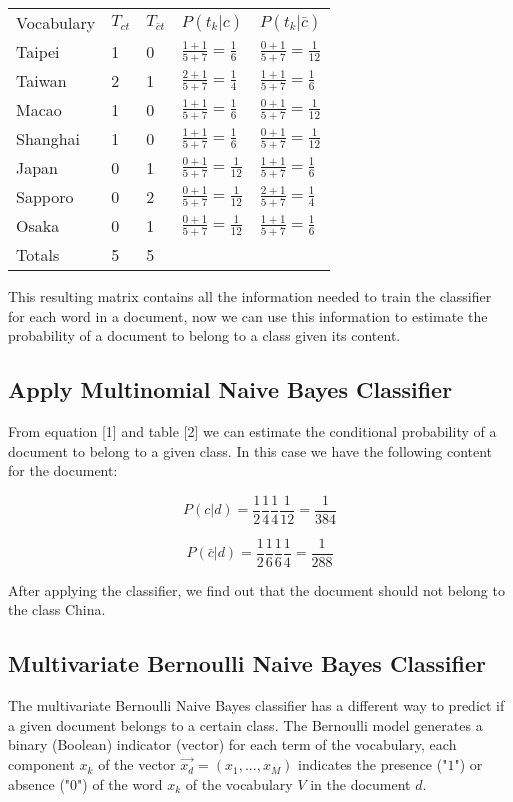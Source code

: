 \begin{table}[H]
\begin{tabular}{lllll}
Vocabulary & $T_{ct}$ &  $T_{\bar{c}t}$ & $P(t_k|c)$  & $P(t_k|\bar{c})$ \\
Taipei & 1 & 0 & $\frac{1+1}{5+7} = \frac{1}{6}$ & $\frac{0+1}{5+7} = \frac{1}{12}$ \\
Taiwan & 2 & 1 & $\frac{2+1}{5+7} = \frac{1}{4}$ & $\frac{1+1}{5+7} = \frac{1}{6}$ \\
Macao & 1 & 0 & $\frac{1+1}{5+7} = \frac{1}{6}$ & $\frac{0+1}{5+7} = \frac{1}{12}$ \\
Shanghai & 1 & 0 & $\frac{1+1}{5+7} = \frac{1}{6}$ & $\frac{0+1}{5+7} = \frac{1}{12}$ \\
Japan & 0 & 1 & $\frac{0+1}{5+7} = \frac{1}{12}$ & $\frac{1+1}{5+7} = \frac{1}{6}$ \\
Sapporo & 0 & 2 & $\frac{0+1}{5+7} = \frac{1}{12}$ & $\frac{2+1}{5+7} = \frac{1}{4}$ \\
Osaka & 0 & 1 & $\frac{0+1}{5+7} = \frac{1}{12}$ & $\frac{1+1}{5+7} = \frac{1}{6}$ \\
Totals & 5 & 5
\end{tabular}
\end{table}

This resulting matrix contains all the information needed to train the classifier for each word in a document, now we can use this information to estimate the probability of a document to belong to a class given its content.

\subsection{Apply Multinomial Naive Bayes Classifier}
From equation [1] and table [2] we can estimate the conditional probability of a document to belong to a given class. In this case we have the following content for the document:

\begin{equation}
    P(c|d) = \frac{1}{2}\frac{1}{4}\frac{1}{4}\frac{1}{12} = \frac{1}{384}
\end{equation}

\begin{equation}
    P(\bar{c}|d) = \frac{1}{2}\frac{1}{6}\frac{1}{6}\frac{1}{4} = \frac{1}{288}
\end{equation}

After applying the classifier, we find out that the document should not belong to the class China.

\subsection{Multivariate Bernoulli Naive Bayes Classifier}
The multivariate Bernoulli Naive Bayes classifier has a different way to predict if a given document belongs to a certain class. The Bernoulli model generates a binary (Boolean) indicator (vector) for each term of the vocabulary, each component $x_k$ of the vector $\vec{x_d} = (x_1, ..., x_M)$ indicates the presence ("$1$") or absence ("$0$") of the word $x_k$ of the vocabulary $V$ in the document $d$.

